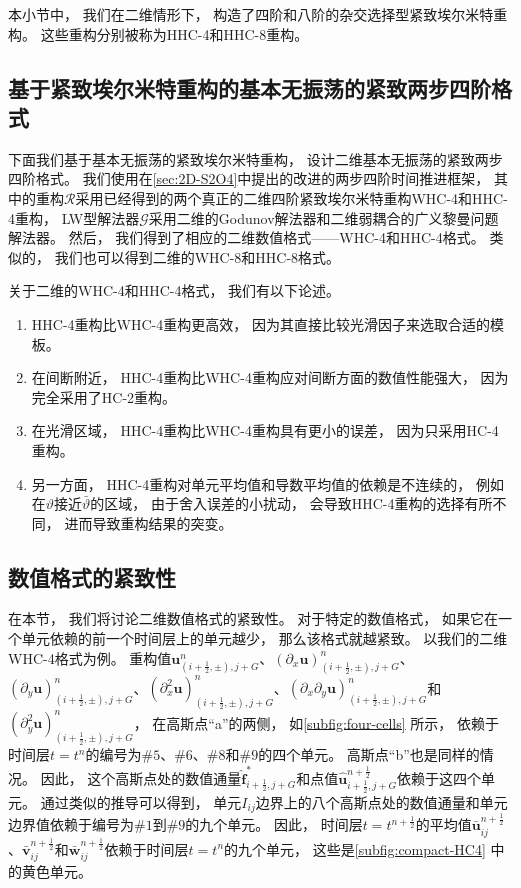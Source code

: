 \vspace{\baselineskip} %
本小节中，
我们在二维情形下，
构造了四阶和八阶的杂交选择型紧致埃尔米特重构。
这些重构分别被称为HHC-4和HHC-8重构。

\subsection{基于紧致埃尔米特重构的基本无振荡的紧致两步四阶格式}

下面我们基于基本无振荡的紧致埃尔米特重构，
设计二维基本无振荡的紧致两步四阶格式。
我们使用在\cref{sec:2D-S2O4}中提出的改进的两步四阶时间推进框架，
其中的重构$\mathcal{R}$采用已经得到的两个真正的二维四阶紧致埃尔米特重构WHC-4和HHC-4重构，
LW型解法器$\mathcal{G}$采用二维的Godunov解法器和二维弱耦合的广义黎曼问题解法器。
然后，
我们得到了相应的二维数值格式——WHC-4和HHC-4格式。
类似的，
我们也可以得到二维的WHC-8和HHC-8格式。

关于二维的WHC-4和HHC-4格式，
我们有以下论述。
\begin{enumerate}
  \item HHC-4重构比WHC-4重构更高效，
        因为其直接比较光滑因子来选取合适的模板。
  \item 在间断附近，
        HHC-4重构比WHC-4重构应对间断方面的数值性能强大，
        因为完全采用了HC-2重构。
  \item 在光滑区域，
        HHC-4重构比WHC-4重构具有更小的误差，
        因为只采用HC-4重构。
  \item 另一方面，
        HHC-4重构对单元平均值和导数平均值的依赖是不连续的，
        例如在$\vartheta$接近$\bar\vartheta$的区域，
        由于舍入误差的小扰动，
        会导致HHC-4重构的选择有所不同，
        进而导致重构结果的突变。
\end{enumerate}

\subsection{数值格式的紧致性}

在本节，
我们将讨论二维数值格式的紧致性。
对于特定的数值格式，
如果它在一个单元依赖的前一个时间层上的单元越少，
那么该格式就越紧致。
以我们的二维WHC-4格式为例。
重构值${\bm{u}}_{(i+\frac{1}{2},\pm),j+G}^{n}$、$({\partial_{x}}{\bm{u}})_{(i+\frac{1}{2},\pm),j+G}^{n}$、$({\partial_{y}}{\bm{u}})_{(i+\frac{1}{2},\pm),j+G}^{n}$、$({\partial_{x}^2}{\bm{u}})_{(i+\frac{1}{2},\pm),j+G}^{n}$、$({\partial_{x}}{\partial_{y}}{\bm{u}})_{(i+\frac{1}{2},\pm),j+G}^{n}$和$({\partial_{y}^2}{\bm{u}})_{(i+\frac{1}{2},\pm),j+G}^{n}$，
在高斯点“a”的两侧，
如\cref{subfig:four-cells} 所示，
依赖于时间层$t=t^n$的编号为$\#5$、$\#6$、$\#8$和$\#9$的四个单元。
高斯点“b”也是同样的情况。
因此，
这个高斯点处的数值通量$\hat{\bm{f}}_{i+\frac{1}{2},j+G}^*$和点值$\hat{\bm{u}}_{i+\frac{1}{2},j+G}^{n+\frac{1}{2}}$依赖于这四个单元。
通过类似的推导可以得到，
单元$I_{ij}$边界上的八个高斯点处的数值通量和单元边界值依赖于编号为$\#1$到$\#9$的九个单元。
因此，
时间层$t=t^{n+\frac{1}{2}}$的平均值$\bar{\bm{u}}_{ij}^{n+\frac{1}{2}}$、$\bar{\bm{v}}_{ij}^{n+\frac{1}{2}}$和$\bar{\bm{w}}_{ij}^{n+\frac{1}{2}}$依赖于时间层$t=t^n$的九个单元，
这些是\cref{subfig:compact-HC4} 中的黄色单元。

